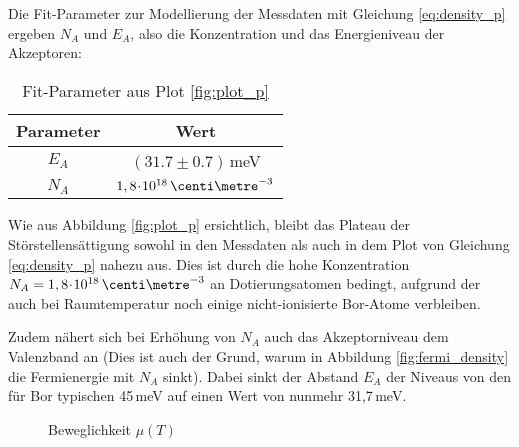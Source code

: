 Die Fit-Parameter zur Modellierung der Messdaten mit Gleichung \eqref{eq:density_p} ergeben $N_A$ und $E_A$, also die Konzentration und das Energieniveau der Akzeptoren:
\begin{table}[h!]
\centering
\caption{Fit-Parameter aus Plot \ref{fig:plot_p}} \label{tab:p_fit}
\begin{tabular}{cc}
	\toprule
	Parameter		& Wert 							\\
	\midrule
	$E_A$		& $(31.7 \pm 0.7)\,$meV				\\
	$N_A$		& $1,8 \cdt 10^{18}\,\centi\metre^{-3}$	\\
	\bottomrule
\end{tabular}
\end{table}

Wie aus Abbildung \ref{fig:plot_p} ersichtlich, bleibt das Plateau der Störstellensättigung sowohl in den Messdaten als auch in dem Plot von Gleichung \eqref{eq:density_p} nahezu aus. Dies ist durch die hohe Konzentration $N_A = 1,8\cdt 10^{18}\,\centi\metre^{-3}$ an Dotierungsatomen bedingt, aufgrund der auch bei Raumtemperatur noch einige nicht-ionisierte Bor-Atome verbleiben.

Zudem nähert sich bei Erhöhung von $N_A$ auch das Akzeptorniveau dem Valenzband an (Dies ist auch der Grund, warum in Abbildung \ref{fig:fermi_density} die Fermienergie mit $N_A$ sinkt). Dabei sinkt der Abstand $E_A$ der Niveaus von den für Bor typischen 45\,meV auf einen Wert von nunmehr 31,7\,meV.

\begin{figure}[p]
\centering
\begin{sideways}

\end{sideways}
\caption{Beweglichkeit $\mu(T)$}
\label{fig:plot_mu}
\end{figure}

\newpage
\begin{addmargin}[-3em]{3em}


\end{addmargin}
